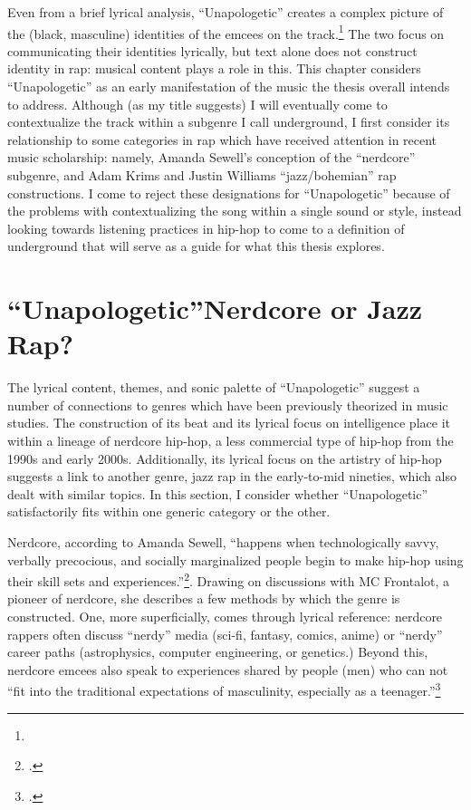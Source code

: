 Even from a brief lyrical analysis, ``Unapologetic'' creates a complex picture of the (black,
masculine) identities of the emcees on the track.\footnote{
    } 
The two focus on communicating their identities lyrically, but text alone does not construct
identity in rap: musical content plays a role in this. This chapter considers ``Unapologetic'' 
as an early manifestation of the music the thesis overall intends to address. Although (as my 
title suggests) I will eventually come to contextualize the track within a subgenre I call 
underground, I first consider its relationship to some categories in rap which have received 
attention in recent music scholarship: namely, Amanda Sewell's conception of the ``nerdcore''
subgenre, and Adam Krims  and Justin Williams ``jazz/bohemian'' rap constructions. I come to 
reject these designations for  ``Unapologetic'' because of the problems with contextualizing 
the song within a single sound or style, instead looking towards listening practices in hip-hop
to come to a definition of underground that will serve as a guide for what this thesis explores.


\section{``Unapologetic''\textemdash Nerdcore or Jazz Rap?} \label{unapologeticnerdcorejazz}

The lyrical content, themes, and sonic palette of ``Unapologetic'' suggest a number of connections 
to genres which have been previously theorized in music studies. The construction of its beat and 
its lyrical focus on intelligence place it within a lineage of nerdcore hip-hop, a less commercial
type of hip-hop from the 1990s and early 2000s. Additionally, its lyrical focus on the artistry of 
hip-hop suggests a link to another genre, jazz rap in the early-to-mid nineties, which also dealt 
with similar topics. In this section, I consider whether ``Unapologetic'' satisfactorily fits within
one generic category or the other.

Nerdcore, according to Amanda Sewell, ``happens when technologically savvy, verbally precocious, and \sloppy
socially marginalized people begin to make hip-hop using their skill sets and 
experiences.''\footnote{
    \autocite[223]{amandasewellNerdcoreHiphop2015}.}. 
Drawing on discussions with MC Frontalot, a pioneer of nerdcore, she describes a few methods by which
the genre is  constructed. One, more superficially, comes through lyrical reference: nerdcore rappers 
often discuss ``nerdy'' media  (sci-fi, fantasy, comics, anime) or ``nerdy'' career paths (astrophysics,
computer engineering, or genetics.) Beyond this, nerdcore emcees also speak to experiences shared by 
people (men) who can not ``fit into the traditional expectations of masculinity, especially as 
a teenager.''\footnote{
    \autocite[225]{amandasewellNerdcoreHiphop2015}.} 

